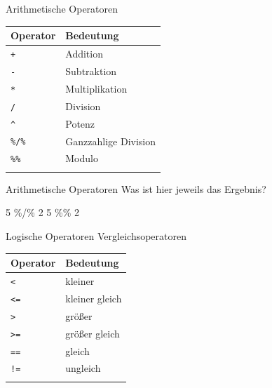 \documentclass[
  10pt,
  ignorenonframetext,
  aspectratio=169,
]{beamer}
\newenvironment{Shaded}{}{}
\newcommand{\DecValTok}[1]{\textcolor[rgb]{0.25,0.63,0.44}{#1}}
\newcommand{\SpecialCharTok}[1]{\textcolor[rgb]{0.25,0.44,0.63}{#1}}
\begin{document}
\begin{frame}[fragile]{Arithmetische Operatoren}
\label{arithmetische-operatoren}
\begin{longtable}[]{@{}ll@{}}
\toprule\noalign{}
Operator & Bedeutung \\
\midrule\noalign{}
\endhead
\texttt{+} & Addition \\
\texttt{-} & Subtraktion \\
\texttt{*} & Multiplikation \\
\texttt{/} & Division \\
\texttt{\^{}} & Potenz \\
\texttt{\%/\%} & Ganzzahlige Division \\
\texttt{\%\%} & Modulo \\
\bottomrule\noalign{}
\end{longtable}
\end{frame}

\begin{frame}[fragile]{Arithmetische Operatoren}
\label{arithmetische-operatoren-1}
Was ist hier jeweils das Ergebnis?

\begin{Shaded}
\begin{Highlighting}[]
\DecValTok{5} \SpecialCharTok{\%/\%} \DecValTok{2}
\DecValTok{5} \SpecialCharTok{\%\%} \DecValTok{2}
\end{Highlighting}
\end{Shaded}
\end{frame}

\begin{frame}[fragile]{Logische Operatoren}
\label{logische-operatoren}
Vergleichsoperatoren

\begin{longtable}[]{@{}ll@{}}
\toprule\noalign{}
Operator & Bedeutung \\
\midrule\noalign{}
\endhead
\texttt{\textless{}} & kleiner \\
\texttt{\textless{}=} & kleiner gleich \\
\texttt{\textgreater{}} & größer \\
\texttt{\textgreater{}=} & größer gleich \\
\texttt{==} & gleich \\
\texttt{!=} & ungleich \\
\bottomrule\noalign{}
\end{longtable}
\end{frame}
\end{document}
